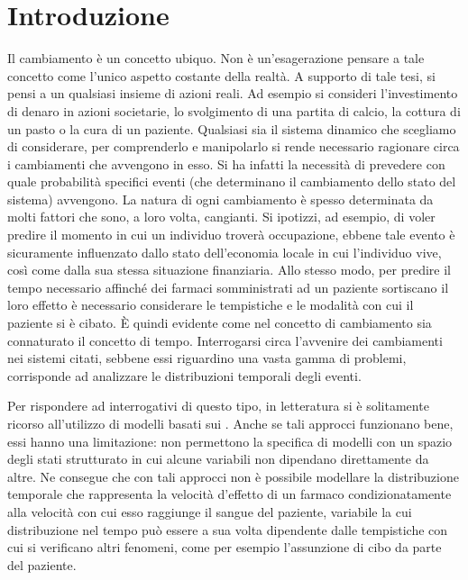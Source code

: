 
\cleardoublepage
{}
\chapter*{Introduzione}\label{cap:intro}
Il cambiamento è un concetto ubiquo.
Non è un'esagerazione pensare a tale concetto come l'unico aspetto costante della realtà.
A supporto di tale tesi, si pensi a un qualsiasi insieme di azioni reali.
Ad esempio si consideri l'investimento di denaro in azioni societarie, lo svolgimento di una partita di calcio, la cottura di un pasto o la cura di un paziente.
Qualsiasi sia il sistema dinamico che scegliamo di considerare, per comprenderlo e manipolarlo si rende necessario ragionare circa i cambiamenti che avvengono in esso.
Si ha infatti la necessità di prevedere con quale probabilità specifici eventi (che determinano il cambiamento dello stato del sistema) avvengono.
La natura di ogni cambiamento è spesso determinata da molti fattori che sono, a loro volta, cangianti.
Si ipotizzi, ad esempio, di voler predire il momento in cui un individuo troverà occupazione, ebbene tale evento è sicuramente influenzato dallo stato dell'economia locale in cui l'individuo vive, così come dalla sua stessa situazione finanziaria.
Allo stesso modo, per predire il tempo necessario affinché dei farmaci somministrati ad un paziente sortiscano il loro effetto è necessario considerare le tempistiche e le modalità con cui il paziente si è cibato.
\`E quindi evidente come nel concetto di cambiamento sia connaturato il concetto di tempo.
Interrogarsi circa l'avvenire dei cambiamenti nei sistemi citati, sebbene essi riguardino una vasta gamma di problemi, corrisponde ad analizzare le distribuzioni temporali degli eventi.

Per rispondere ad interrogativi di questo tipo, in letteratura si è solitamente ricorso all'utilizzo di modelli basati sui \mprocess{}
\citep{Duffie1996,Lando1998}.
Anche se tali approcci funzionano bene, essi hanno una limitazione: non permettono la specifica di modelli con un spazio degli stati strutturato in cui alcune variabili non dipendano direttamente da altre. Ne consegue che con tali approcci non è possibile modellare la distribuzione temporale che rappresenta la velocità d'effetto di un farmaco condizionatamente alla velocità con cui esso raggiunge il sangue del paziente, variabile la cui distribuzione nel tempo può essere a sua volta dipendente dalle tempistiche con cui si verificano altri fenomeni, come per esempio l'assunzione di cibo da parte del paziente.


